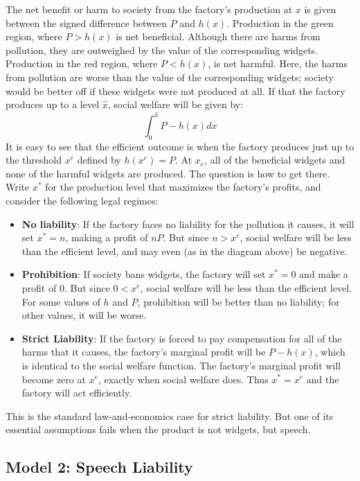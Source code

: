 The net benefit or harm to society from the factory's production at $x$ is given between the signed difference between $P$ and $h(x)$. Production in the green region, where $P > h(x)$ is net beneficial. Although there are harms from pollution, they are outweighed by the value of the corresponding widgets. Production in the red region, where $P < h(x)$, is net harmful. Here, the harms from pollution are worse than the value of the corresponding widgets; society would be better off if these widgets were not produced at all. If that the factory produces up to a level $\hat{x}$, social welfare will be given by:
\begin{equation}
\int_{0}^{\hat{x}} P - h(x) dx
\end{equation}
It is easy to see that the efficient outcome is when the factory produces just up to the threshold $x^e$ defined by $h(x^e) = P$. At $x_e$, all of the beneficial widgets and none of the harmful widgets are produced. The question is how to get there. Write $x^{\ast}$ for the production level that maximizes the factory's profits, and consider the following legal regimes:
\begin{itemize}
\item \textbf{No liability}: If the factory faces no liability for the pollution it causes, it will set $x^{\ast} = n$, making a profit of $nP$. But since $n > x^e$, social welfare will be less than the efficient level, and may even (as in the diagram above) be negative.
\item \textbf{Prohibition}: If society bans widgets, the factory will set $x^{\ast} = 0$ and make a profit of $0$. But since $0 < x^e$, social welfare will be less than the efficient level. For some values of $h$ and $P$, prohibition will be better than no liability; for other values, it will be worse.
\item \textbf{Strict Liability}: If the factory is forced to pay compensation for all of the harms that it causes, the factory's marginal profit will be $P - h(x)$, which is identical to the social welfare function. The factory's marginal profit will become zero at $x^e$, exactly when social welfare does. Thus $x^{\ast} = x^e$ and the factory will act efficiently.
\end{itemize}
This is the standard law-and-economics case for strict liability. But one of its essential assumptions fails when the product is not widgets, but speech.


\subsection{Model 2: Speech Liability}

